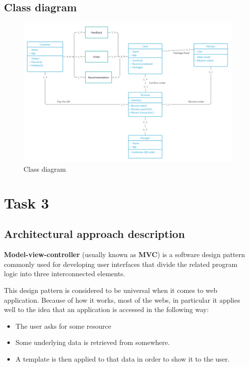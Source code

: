 \documentclass[a4paper]{article}
\numberwithin{equation}{section}
\begin{document}
\subsection{Class diagram}
\begin{figure}[H]
  \centering
  \includegraphics[width=\textwidth]{./assets/t2/Task 2.3_SE.png}
  \caption{Class diagram}
\end{figure}

\newpage

\section{Task 3}
\subsection{Architectural approach description}
\textbf{Model-view-controller} (usually known as \textbf{MVC}) is a software design pattern commonly used for developing user interfaces that divide the related program logic into three interconnected elements.

This design pattern is considered to be universal when it comes to web application.
Because of how it works, most of the webs, in particular it applies well to the idea that an application is accessed in the following way:
\begin{itemize}
  \item The user asks for some resource
  \item Some underlying data is retrieved from somewhere.
  \item A template is then applied to that data in order to show it to the user.
\end{itemize}
\end{document}
